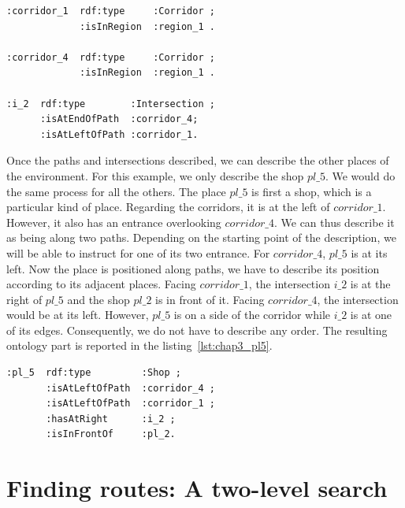 \begin{lstlisting}[frame=single, basicstyle=\scriptsize\ttfamily, label={lst:chap3_corridors}, caption={Description of the two corridor and their common intersection in the OWL language using the Turle syntax.},captionpos=b, style=OwlTurtle_indiv]
:corridor_1  rdf:type     :Corridor ;
             :isInRegion  :region_1 .
             
:corridor_4  rdf:type     :Corridor ;
             :isInRegion  :region_1 .
             
:i_2  rdf:type        :Intersection ;
      :isAtEndOfPath  :corridor_4;
      :isAtLeftOfPath :corridor_1.
\end{lstlisting}

Once the paths and intersections described, we can describe the other places of the environment. For this example, we only describe the shop $pl\_5$. We would do the same process for all the others. The place $pl\_5$ is first a shop,  which is a particular kind of place. Regarding the corridors, it is at the left of $corridor\_1$. However, it also has an entrance overlooking $corridor\_4$. We can thus describe it as being along two paths. Depending on the starting point of the description, we will be able to instruct for one of its two entrance. For $corridor\_4$, $pl\_5$ is at its left. Now the place is positioned along paths, we have to describe its position according to its adjacent places. Facing $corridor\_1$, the intersection $i\_2$ is at the right of $pl\_5$ and the shop $pl\_2$ is in front of it. Facing $corridor\_4$, the intersection would be at its left. However, $pl\_5$ is on a side of the corridor while $i\_2$ is at one of its edges. Consequently, we do not have to describe any order. The resulting ontology part is reported in the listing~\ref{lst:chap3_pl5}.

\begin{lstlisting}[frame=single, basicstyle=\scriptsize\ttfamily, label={lst:chap3_pl5}, caption={Description of the shop pl\_5 using the SSR in the OWL language using the Turle syntax.},captionpos=b, style=OwlTurtle_indiv]
:pl_5  rdf:type         :Shop ;
       :isAtLeftOfPath  :corridor_4 ;
       :isAtLeftOfPath  :corridor_1 ;
       :hasAtRight      :i_2 ;
       :isInFrontOf     :pl_2.
\end{lstlisting}

\section{Finding routes: A two-level search}


